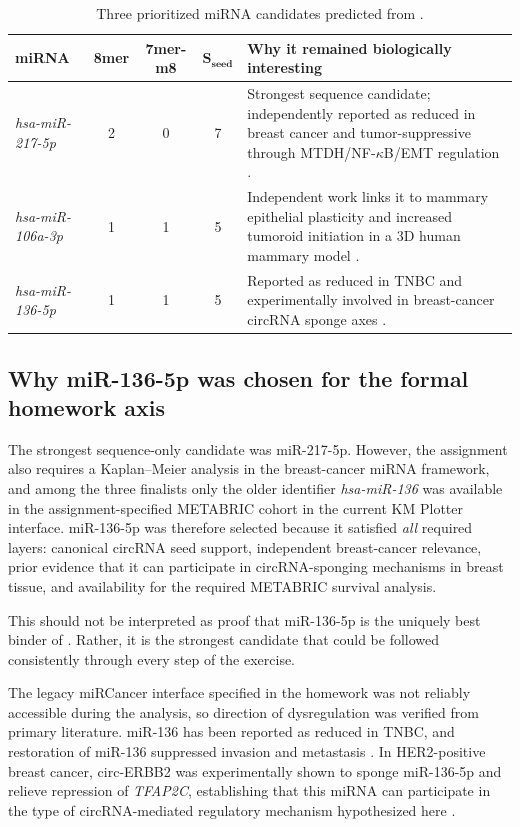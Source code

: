 \documentclass[11pt]{article}
\newcommand{\mir}[1]{\textit{#1}}
\newcommand{\gene}[1]{\textit{#1}}
\newcommand{\circrna}[1]{\texttt{\detokenize{#1}}}
\begin{document}
\begin{table}[ht]
\centering
\caption{Three prioritized miRNA candidates predicted from \circrna{hsa_circ_0087640}.}
\label{tab:mirs}
\begin{tabularx}{\linewidth}{@{}l c c c X@{}}
\toprule
\textbf{miRNA} & \textbf{8mer} & \textbf{7mer-m8} & $\mathbf{S_{seed}}$ & \textbf{Why it remained biologically interesting} \\
\midrule
\mir{hsa-miR-217-5p} & 2 & 0 & 7 & Strongest sequence candidate; independently reported as reduced in breast cancer and tumor-suppressive through MTDH/NF-$\kappa$B/EMT regulation \cite{Yang2022miR217}. \\
\mir{hsa-miR-106a-3p} & 1 & 1 & 5 & Independent work links it to mammary epithelial plasticity and increased tumoroid initiation in a 3D human mammary model \cite{Robert2026miR106a}. \\
\mir{hsa-miR-136-5p} & 1 & 1 & 5 & Reported as reduced in TNBC and experimentally involved in breast-cancer circRNA sponge axes \cite{Yan2016miR136,Zhong2021circERBB2}. \\
\bottomrule
\end{tabularx}
\end{table}

\subsection{Why miR-136-5p was chosen for the formal homework axis}

The strongest sequence-only candidate was miR-217-5p. However, the assignment also requires a Kaplan--Meier analysis in the breast-cancer miRNA framework, and among the three finalists only the older identifier \mir{hsa-miR-136} was available in the assignment-specified METABRIC cohort in the current KM Plotter interface. miR-136-5p was therefore selected because it satisfied \emph{all} required layers: canonical circRNA seed support, independent breast-cancer relevance, prior evidence that it can participate in circRNA-sponging mechanisms in breast tissue, and availability for the required METABRIC survival analysis.

This should not be interpreted as proof that miR-136-5p is the uniquely best binder of \circrna{hsa_circ_0087640}. Rather, it is the strongest candidate that could be followed consistently through every step of the exercise.

The legacy miRCancer interface specified in the homework was not reliably accessible during the analysis, so direction of dysregulation was verified from primary literature. miR-136 has been reported as reduced in TNBC, and restoration of miR-136 suppressed invasion and metastasis \cite{Yan2016miR136}. In HER2-positive breast cancer, circ-ERBB2 was experimentally shown to sponge miR-136-5p and relieve repression of \gene{TFAP2C}, establishing that this miRNA can participate in the type of circRNA-mediated regulatory mechanism hypothesized here \cite{Zhong2021circERBB2}.
\end{document}
